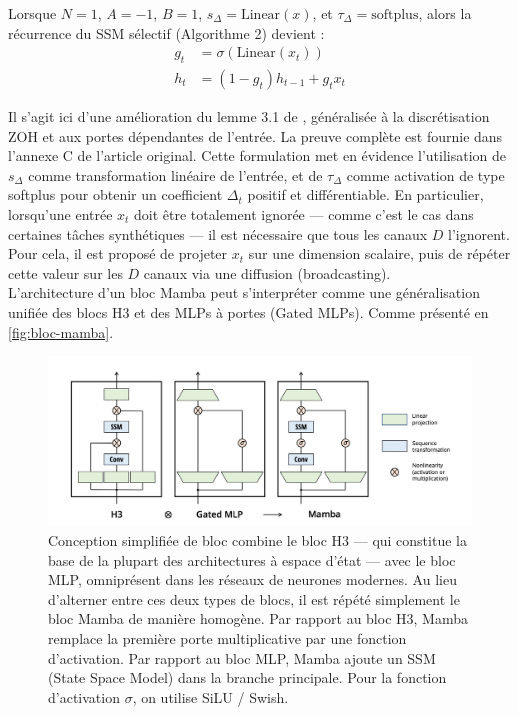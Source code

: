 \newpage

\begin{theorem}
Lorsque \( N = 1 \), \( A = -1 \), \( B = 1 \), \( s_{\Delta} = \text{Linear}(x) \), et \( \tau_{\Delta} = \text{softplus} \), alors la récurrence du SSM sélectif (Algorithme 2) devient :
\begin{align}
    g_t &= \sigma(\text{Linear}(x_t)) \\
    h_t &= (1 - g_t) h_{t-1} + g_t x_t
\end{align}
\end{theorem}

Il s’agit ici d’une amélioration du lemme 3.1 de \citep{gu2021combining}, généralisée à la discrétisation ZOH et aux portes dépendantes de l’entrée. La preuve complète est fournie dans l’annexe C de l’article original. Cette formulation met en évidence l’utilisation de $s_{\Delta}$ comme transformation linéaire de l’entrée, et de $\tau_{\Delta}$ comme activation de type softplus pour obtenir un coefficient $\Delta_t$ positif et différentiable. En particulier, lorsqu’une entrée $x_t$ doit être totalement ignorée — comme c’est le cas dans certaines tâches synthétiques — il est nécessaire que tous les canaux $D$ l’ignorent. Pour cela, il est proposé de projeter $x_t$ sur une dimension scalaire, puis de répéter cette valeur sur les $D$ canaux via une diffusion (broadcasting).\\

L’architecture d’un bloc Mamba peut s’interpréter comme une généralisation unifiée des blocs H3 et des MLPs à portes (Gated MLPs). Comme présenté en \autoref{fig:bloc-mamba}.

\begin{figure}[H]
    \centering
    \includegraphics[width=1.0\linewidth]{images/mamba_architecture.png}
    \caption{\justifying Conception simplifiée de bloc combine le bloc H3 — qui constitue la base de la plupart des architectures à espace d’état — avec le bloc MLP, omniprésent dans les réseaux de neurones modernes. Au lieu d’alterner entre ces deux types de blocs, il est répété simplement le bloc Mamba de manière homogène. Par rapport au bloc H3, Mamba remplace la première porte multiplicative par une fonction d’activation. Par rapport au bloc MLP, Mamba ajoute un SSM (State Space Model) dans la branche principale. Pour la fonction d’activation $\sigma$, on utilise SiLU / Swish.}
    \label{fig:bloc-mamba}
\end{figure}

